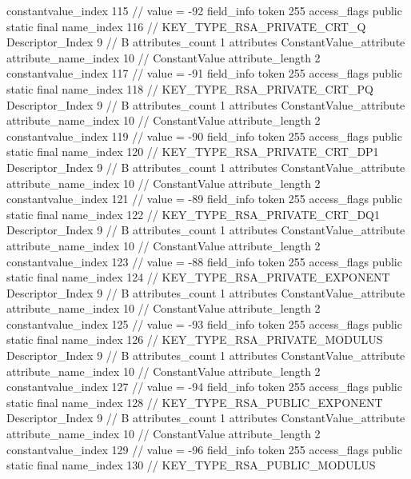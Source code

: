 {{{{{{{					constantvalue_index	115		// value = -92
				}
				}
			}
			field_info {
				token	255
				access_flags	public static final
				name_index	116		// KEY_TYPE_RSA_PRIVATE_CRT_Q
				Descriptor_Index	9		// B
				attributes_count	1
				attributes {
				ConstantValue_attribute {
					attribute_name_index	10		// ConstantValue
					attribute_length	2
					constantvalue_index	117		// value = -91
				}
				}
			}
			field_info {
				token	255
				access_flags	public static final
				name_index	118		// KEY_TYPE_RSA_PRIVATE_CRT_PQ
				Descriptor_Index	9		// B
				attributes_count	1
				attributes {
				ConstantValue_attribute {
					attribute_name_index	10		// ConstantValue
					attribute_length	2
					constantvalue_index	119		// value = -90
				}
				}
			}
			field_info {
				token	255
				access_flags	public static final
				name_index	120		// KEY_TYPE_RSA_PRIVATE_CRT_DP1
				Descriptor_Index	9		// B
				attributes_count	1
				attributes {
				ConstantValue_attribute {
					attribute_name_index	10		// ConstantValue
					attribute_length	2
					constantvalue_index	121		// value = -89
				}
				}
			}
			field_info {
				token	255
				access_flags	public static final
				name_index	122		// KEY_TYPE_RSA_PRIVATE_CRT_DQ1
				Descriptor_Index	9		// B
				attributes_count	1
				attributes {
				ConstantValue_attribute {
					attribute_name_index	10		// ConstantValue
					attribute_length	2
					constantvalue_index	123		// value = -88
				}
				}
			}
			field_info {
				token	255
				access_flags	public static final
				name_index	124		// KEY_TYPE_RSA_PRIVATE_EXPONENT
				Descriptor_Index	9		// B
				attributes_count	1
				attributes {
				ConstantValue_attribute {
					attribute_name_index	10		// ConstantValue
					attribute_length	2
					constantvalue_index	125		// value = -93
				}
				}
			}
			field_info {
				token	255
				access_flags	public static final
				name_index	126		// KEY_TYPE_RSA_PRIVATE_MODULUS
				Descriptor_Index	9		// B
				attributes_count	1
				attributes {
				ConstantValue_attribute {
					attribute_name_index	10		// ConstantValue
					attribute_length	2
					constantvalue_index	127		// value = -94
				}
				}
			}
			field_info {
				token	255
				access_flags	public static final
				name_index	128		// KEY_TYPE_RSA_PUBLIC_EXPONENT
				Descriptor_Index	9		// B
				attributes_count	1
				attributes {
				ConstantValue_attribute {
					attribute_name_index	10		// ConstantValue
					attribute_length	2
					constantvalue_index	129		// value = -96
				}
				}
			}
			field_info {
				token	255
				access_flags	public static final
				name_index	130		// KEY_TYPE_RSA_PUBLIC_MODULUS
}}}}}

